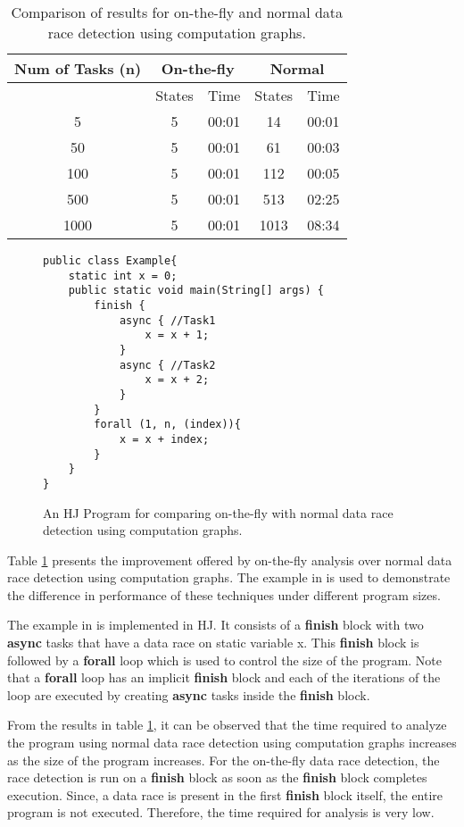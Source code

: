 \begin{table}
\centering
\caption{Comparison of results for on-the-fly and normal data race detection using computation graphs.}
\label{tab:otf}
\begin{tabular}{|c|c|c|c|c|}
\hline
    	{Num of Tasks (n)} & 
		 \multicolumn{2}{c|}{On-the-fly} &
		\multicolumn{2}{c|}{Normal} \\ \hline
		
 & States & Time & States & Time  \\ \hline
5  & 5 & 00:01  & 14 & 00:01  \\ \hline
50  & 5 & 00:01  & 61 & 00:03  \\ \hline
100  & 5 & 00:01  & 112 & 00:05  \\ \hline
500  & 5 & 00:01  & 513 & 02:25  \\ \hline
1000  & 5 & 00:01  & 1013 & 08:34  \\ \hline

\end{tabular}
\end{table}

\begin{figure}
  \begin{center}
    \begin{lstlisting}
public class Example{
	static int x = 0;
	public static void main(String[] args) {
		finish {
			async { //Task1
				x = x + 1;
			}
			async { //Task2
				x = x + 2;
			}
		}
		forall (1, n, (index)){
			x = x + index;
		}
	}
}
\end{lstlisting}
  \end{center}
  \caption{An HJ Program for comparing on-the-fly with normal data race detection using computation graphs.}
  \label{fig:hj-otf}
\end{figure}

Table \ref{tab:otf} presents the improvement offered by on-the-fly analysis over normal data race detection  using computation graphs. The example in  is used to demonstrate the difference in performance of these techniques under different program sizes. 

The example in  is implemented in HJ. It consists of a \textbf{finish} block with two \textbf{async} tasks that have a data race on static variable x. This \textbf{finish} block is followed by a \textbf{forall} loop which is used to control the size of the program. Note that a \textbf{forall} loop has an implicit \textbf{finish} block and each of the iterations of the loop are executed by creating \textbf{async} tasks inside the \textbf{finish} block. 

From the results in table \ref{tab:otf}, it can be observed that the time required to analyze the program using normal data race detection using computation graphs increases as the size of the program increases. For the on-the-fly data race detection, the race detection is run on a \textbf{finish} block as soon as the \textbf{finish} block completes execution. Since, a data race is present in the first \textbf{finish} block itself, the entire program is not executed. Therefore, the time required for analysis is very low.
